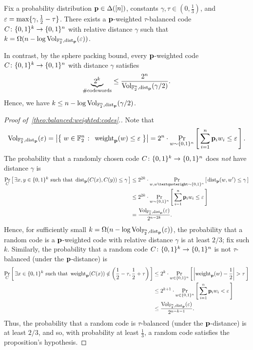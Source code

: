 \begin{proposition}\label{theo:balanced:weighted:codes}
  Fix a probability distribution $\p\in\distribs{[n]}$, constants $\gamma, \tau\in(0,\tfrac{1}{3})$, and $\eps = \max\{\gamma, \frac12 - \tau\}$. There exists a  $\p$-weighted $\tau$-balanced code $C\colon\bitset^k\to\bitset^n$ with relative distance $\gamma$ such that $k = \Omega(n - \log \operatorname{Vol}_{\mathbb{F}_2^n,\pdistfunc[\p]}(\eps))$.
\end{proposition}

In contrast, by the sphere packing bound, every $\p$-weighted code $C\colon\bitset^k \to\bitset^n$ with distance $\gamma$ satisfies
\[
      \underbrace{2^k}_{\#\text{codewords}} \leq \frac{2^n}{\operatorname{Vol}_{\mathbb{F}_2^n,\pdistfunc[\p]}(\gamma/2) }.
\]
Hence, we have $k \leq n - \log \operatorname{Vol}_{\mathbb{F}_2^n,\pdistfunc[\p]}(\gamma/2)$.
\begin{proof}[Proof of~\cref{theo:balanced:weighted:codes}.]
Note that
\begin{equation*}
    \operatorname{Vol}_{\mathbb{F}_2^n,\pdistfunc[\p]}(\eps) 
    =\abs{ \setOfSuchThat{w\in \mathbb{F}_2^n }{ \pweight[\p]{w} \leq \eps } }
    =2^n \cdot \probaDistrOf{w\sim\bitset^n}{  \sum_{i=1}^n \p_i w_i \leq \eps}.
\end{equation*}
The probability that a randomly chosen code $C\colon\bitset^k\to\bitset^n$ does \emph{not} have distance $\gamma$ is
\begin{align*}
	\probaDistrOf{C}{\exists x,y \in \bitset^k \text{ such that } \pdist[\p]{C(x)}{C(y)} \leq \gamma} 
	& \leq 2^{2k} \cdot \probaDistrOf{w,w’ \sim \bitset^n}{\pdist[\p]{w}{w'} \leq \gamma} \\
	& \leq 2^{2k} \cdot\probaDistrOf{w\sim\bitset^n}{\sum_{i=1}^{n} \p_i w_i \leq \eps} \\
	& =  \frac{\operatorname{Vol}_{\mathbb{F}_2^n,\pdistfunc[\p]}(\eps)}{2^{n-2k}}.
\end{align*}
Hence, for sufficiently small $k = \Omega(n - \log \operatorname{Vol}_{\mathbb{F}_2^n,\pdistfunc[\p]}(\eps))$,  the probability that a random code is a $\p$-weighted code with relative distance $\gamma$ is at least $2/3$; fix such $k$. Similarly, the probability that a random code  $C\colon\bitset^k\to\bitset^n$ is not $\tau$-balanced (under the $\p$-distance) is
\begin{align*}
	\probaDistrOf{C}{\exists x \in \bitset^k \text{ such that } \pweight[\p]{C(x)} \notin \left(\frac{1}{2} -\tau, \frac{1}{2}+\tau\right)} 
	& \leq 2^{k} \cdot \probaDistrOf{w \in\bitset^n}{\abs{\pweight[\p]{w} - \frac12} > \tau} \\
	& \leq  2^{k+1} \cdot\probaDistrOf{w\in\bitset^n}{\sum_{i=1}^{n} \p_i w_i < \eps} \\
	& \leq \frac{\operatorname{Vol}_{\mathbb{F}_2^n,\pdistfunc[\p]}(\eps)}{2^{n-k-1}}.
\end{align*}
Thus, the probability that a random code is $\tau$-balanced (under the $\p$-distance) is at least $2/3$, and so, with probability at least $\tfrac{1}{3}$, a random code satisfies the proposition's hypothesis.
\end{proof}

